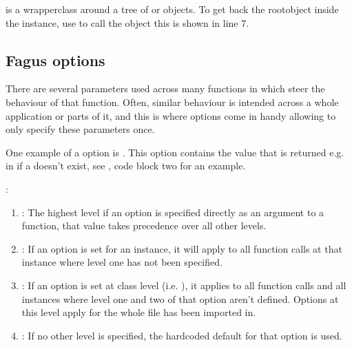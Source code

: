 \documentclass[a4paper,10pt,english]{sphinxmanual}
\begin{document}
\sphinxAtStartPar
{} is a wrapper\sphinxhyphen{}class around a tree of \sphinxhyphen{} or \sphinxhyphen{}objects. To get back the root\sphinxhyphen{}object inside the instance, use \sphinxcode{\sphinxupquote{()}} to call the object \textendash{} this is shown in line 7.


\subsection{Fagus options}
\label{\detokenize{README:fagus-options}}
\sphinxAtStartPar
There are several parameters used across many functions in  which steer the behaviour of that function. Often, similar behaviour is intended across a whole application or parts of it, and this is where options come in handy allowing to only specify these parameters once.

\sphinxAtStartPar
One example of a \sphinxhyphen{}option is {\hyperref[\detokenize{README:default}]{}}. This option contains the value that is returned e.g. in  if a  doesn’t exist, see {\hyperref[\detokenize{README:introduction-what-it-solves}]{}}, code block two for an example.

\sphinxAtStartPar
{}:
\begin{enumerate}
%
\item {}
\sphinxAtStartPar
{}: The highest level \sphinxhyphen{} if an option is specified directly as an argument to a function, that value takes precedence over all other levels.

\item {}
\sphinxAtStartPar
{}: If an option is set for an instance, it will apply to all function calls at that instance where level one has not been specified.

\item {}
\sphinxAtStartPar
{}: If an option is set at class level (i.e. ), it applies to all function calls and all instances where level one and two of that option aren’t defined. Options at this level apply for the whole file  has been imported in.

\item {}
\sphinxAtStartPar
{}: If no other level is specified, the hardcoded default for that option is used.

\end{enumerate}
\end{document}

